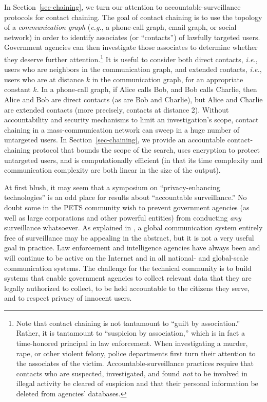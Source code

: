 In Section~\ref{sec-chaining}, we turn our attention to 
accountable-surveillance protocols for contact chaining.
The goal of contact chaining is to use the topology of a {\it communication 
graph} ({\it e.g.}, a phone-call graph, email graph, or social network) 
in order to identify associates (or ``contacts'') of lawfully targeted users. 
Government agencies can then investigate those associates to determine whether
they deserve further attention.\footnote{Note that contact chaining is not
tantamount to ``guilt by association.''  Rather, it is tantamount to
``suspicion by association,'' which is in fact a time-honored principal in
law enforcement.  When investigating a murder, rape, or other violent felony,
police departments first turn their attention to the associates of the victim.
Accountable-surveillance practices require that contacts who are suspected,
investigated, and found {\it not} to be involved in illegal activity be 
cleared of suspicion and that their personal information be deleted from 
agencies' databases.} It is useful to consider both direct contacts, 
{\it i.e.}, users who are neighbors in the communication graph, and
extended contacts, {\it i.e.}, users who are at distance $k$ in the 
communication graph, for an appropriate constant $k$.
In a phone-call graph, if Alice calls Bob, 
and Bob calls Charlie, then Alice and Bob are direct contacts (as are Bob and 
Charlie), but Alice and Charlie are extended contacts (more precisely,
contacts at distance 2).  Without accountability and security mechanisms to
limit an investigation's scope, contact chaining in a mass-communication
network can sweep in a huge number of untargeted users.
In Section~\ref{sec-chaining}, we provide an accountable contact-chaining
protocol that bounds the scope of the search, uses encryption to protect 
untargeted users, and is computationally efficient (in that its time
complexity and communication complexity are both linear in the size of the 
output).

At first blush, it may seem that a symposium on ``privacy-enhancing 
technologies'' is an odd place for results about ``accountable surveillance.''
No doubt some in the PETS community wish to prevent government agencies 
(as well as large corporations and other powerful entities) from conducting 
{\it any} surveillance whatsoever.  As explained in \cite{sff-foci2014}, a 
global communication system entirely free of surveillance may be appealing in
the abstract, but it is not a very useful goal in practice.  Law enforcement
and intelligence agencies have always been and will continue to be active 
on the Internet and in all national- and global-scale communication systems.
The challenge for the technical community is to build systems that enable
government agencies to collect relevant data that they are legally authorized
to collect, to be held accountable to the citizens they serve, and to respect 
privacy of innocent users.

